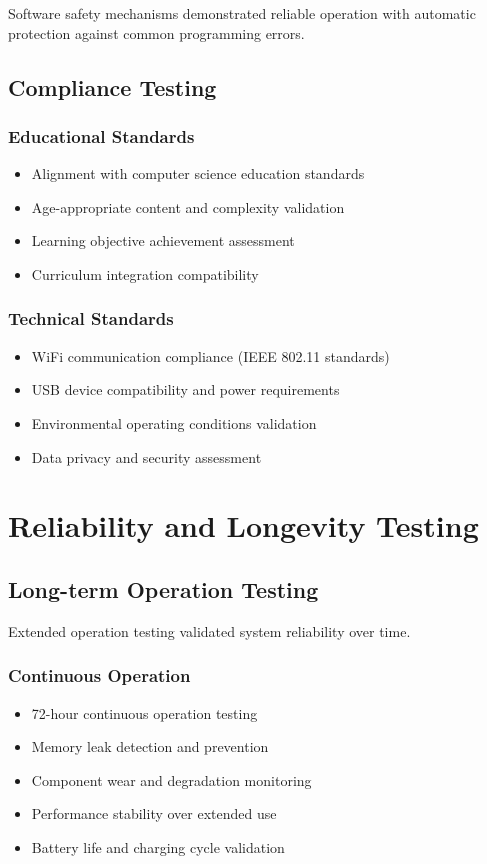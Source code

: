Software safety mechanisms demonstrated reliable operation with automatic protection against common programming errors.

\subsection{Compliance Testing}

\subsubsection{Educational Standards}
\begin{itemize}
    \item Alignment with computer science education standards
    \item Age-appropriate content and complexity validation
    \item Learning objective achievement assessment
    \item Curriculum integration compatibility
\end{itemize}

\subsubsection{Technical Standards}
\begin{itemize}
    \item WiFi communication compliance (IEEE 802.11 standards)
    \item USB device compatibility and power requirements
    \item Environmental operating conditions validation
    \item Data privacy and security assessment
\end{itemize}

\section{Reliability and Longevity Testing}

\subsection{Long-term Operation Testing}

Extended operation testing validated system reliability over time.

\subsubsection{Continuous Operation}
\begin{itemize}
    \item 72-hour continuous operation testing
    \item Memory leak detection and prevention
    \item Component wear and degradation monitoring
    \item Performance stability over extended use
    \item Battery life and charging cycle validation
\end{itemize}

